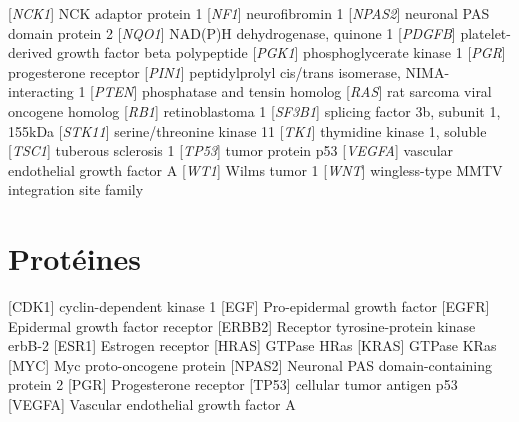 \begin{acronym}[CDKN2A]
					[\emph{NCK1}]	{NCK adaptor protein 1}
					[\emph{NF1}]	{neurofibromin 1}
					[\emph{NPAS2}]	{neuronal PAS domain protein 2}
					[\emph{NQO1}]	{NAD(P)H dehydrogenase, quinone 1}
					[\emph{PDGFB}]	{platelet-derived growth factor beta polypeptide}
					[\emph{PGK1}]	{phosphoglycerate kinase 1}
					[\emph{PGR}]	{progesterone receptor}
					[\emph{PIN1}]	{peptidylprolyl cis/trans isomerase, NIMA-interacting 1}
					[\emph{PTEN}]	{phosphatase and tensin homolog}
					[\emph{RAS}]	{rat sarcoma viral oncogene homolog}
					[\emph{RB1}]	{retinoblastoma 1}
					[\emph{SF3B1}]	{splicing factor 3b, subunit 1, 155kDa}
					[\emph{STK11}]	{serine/threonine kinase 11}
					[\emph{TK1}]	{thymidine kinase 1, soluble}
					[\emph{TSC1}]	{tuberous sclerosis 1}
					[\emph{TP53}]	{tumor protein p53}
					[\emph{VEGFA}]	{vascular endothelial growth factor A}
					[\emph{WT1}]	{Wilms tumor 1}
					[\emph{WNT}]	{wingless-type MMTV integration site family}
		\end{acronym}

	\section{\textcolor{white!15!black}{Protéines}}\label{app:ac:protéines}
		\begin{acronym}[CDKN2A]
				[CDK1]	{cyclin-dependent kinase 1}
					[EGF]	{Pro-epidermal growth factor}
				[EGFR]	{Epidermal growth factor receptor}
				[ERBB2]	{Receptor tyrosine-protein kinase erbB-2}
				[ESR1]	{Estrogen receptor}
				[HRAS]	{GTPase HRas}
				[KRAS]	{GTPase KRas}
					[MYC]	{Myc proto-oncogene protein}
				[NPAS2]	{Neuronal PAS domain-containing protein 2}
					[PGR]	{Progesterone receptor}
				[TP53]	{cellular tumor antigen p53}
				[VEGFA]	{Vascular endothelial growth factor A}
		\end{acronym}

